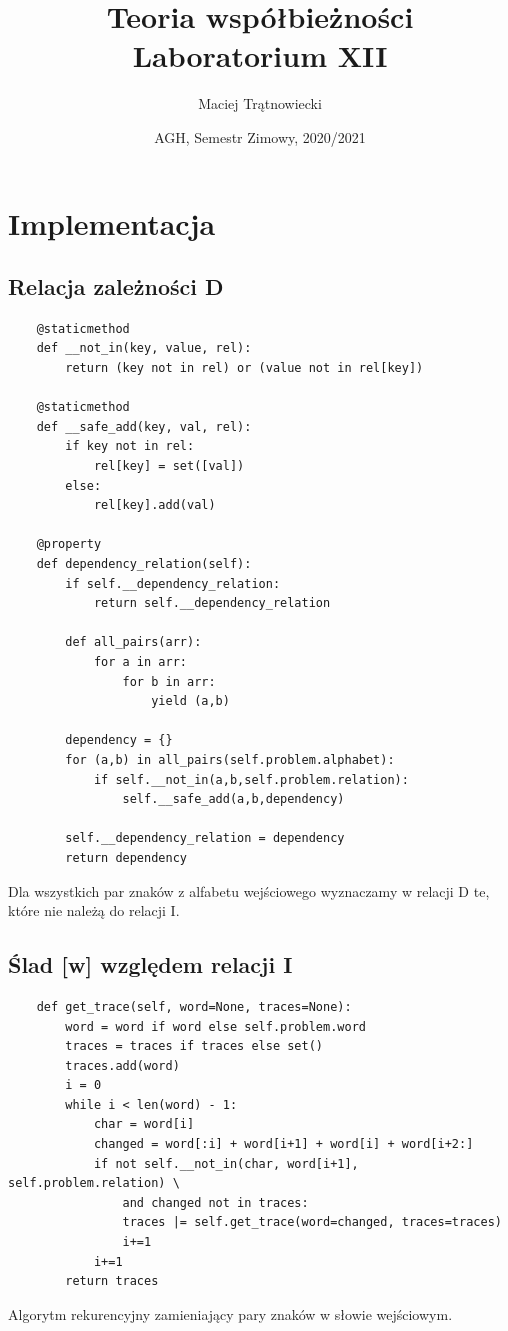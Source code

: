 \documentclass{article}
\title{Teoria współbieżności\\ 
Laboratorium XII}
\author{Maciej Trątnowiecki}
\date{AGH, Semestr Zimowy, 2020/2021}
\begin{document}
    \maketitle
    \section{Implementacja}
        \subsection{Relacja zależności D}
            \begin{lstlisting}
    @staticmethod
    def __not_in(key, value, rel):
        return (key not in rel) or (value not in rel[key])

    @staticmethod
    def __safe_add(key, val, rel):
        if key not in rel:
            rel[key] = set([val])
        else:
            rel[key].add(val)

    @property
    def dependency_relation(self):
        if self.__dependency_relation:
            return self.__dependency_relation

        def all_pairs(arr):
            for a in arr:
                for b in arr:
                    yield (a,b)

        dependency = {}
        for (a,b) in all_pairs(self.problem.alphabet):
            if self.__not_in(a,b,self.problem.relation):
                self.__safe_add(a,b,dependency)

        self.__dependency_relation = dependency
        return dependency
            \end{lstlisting}
        Dla wszystkich par znaków z alfabetu wejściowego wyznaczamy w relacji D te, które nie należą do relacji I. 
        
        \subsection{Ślad [w] względem relacji I}
            \begin{lstlisting}
    def get_trace(self, word=None, traces=None):
        word = word if word else self.problem.word
        traces = traces if traces else set()
        traces.add(word)
        i = 0
        while i < len(word) - 1:
            char = word[i]
            changed = word[:i] + word[i+1] + word[i] + word[i+2:]
            if not self.__not_in(char, word[i+1], self.problem.relation) \
                and changed not in traces:
                traces |= self.get_trace(word=changed, traces=traces)
                i+=1
            i+=1
        return traces
            \end{lstlisting}
            Algorytm rekurencyjny zamieniający pary znaków w słowie wejściowym. 
            
\end{document}
